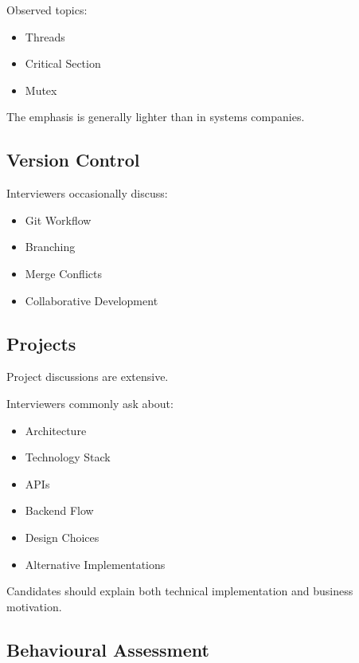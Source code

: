\documentclass[11pt,a4paper]{article}
\begin{document}
Observed topics:

\begin{itemize}
	\item Threads
	\item Critical Section
	\item Mutex
\end{itemize}

The emphasis is generally lighter than in systems companies.


\subsection{Version Control}

Interviewers occasionally discuss:

\begin{itemize}
	\item Git Workflow
	\item Branching
	\item Merge Conflicts
	\item Collaborative Development
\end{itemize}


\subsection{Projects}

Project discussions are extensive.

Interviewers commonly ask about:

\begin{itemize}
	\item Architecture
	\item Technology Stack
	\item APIs
	\item Backend Flow
	\item Design Choices
	\item Alternative Implementations
\end{itemize}

Candidates should explain both technical implementation and business motivation.


\subsection{Behavioural Assessment}
\end{document}
